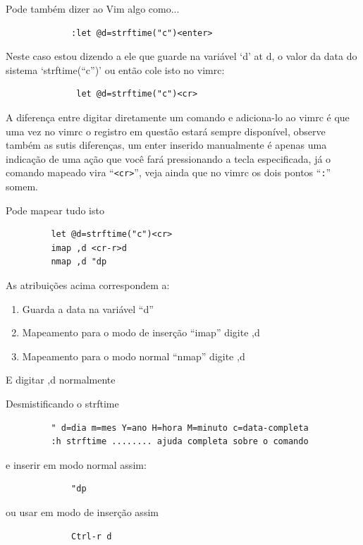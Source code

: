 \documentclass[10pt,a4paper,openany]{book}
\begin{document}
Pode também dizer ao Vim algo como...

\begin{verbatim}
			 :let @d=strftime("c")<enter>
\end{verbatim}

Neste caso estou dizendo a ele que guarde na variável `d' at d,
o valor da data do sistema `strftime(``c'')' ou então cole isto no
vimrc:

\begin{verbatim}
			  let @d=strftime("c")<cr>
\end{verbatim}

A diferença entre digitar diretamente um comando e adiciona-lo ao
vimrc é que uma vez no vimrc o registro em questão estará sempre
disponível, observe também as sutis diferenças, um enter inserido
manualmente é apenas uma indicação de uma ação que você fará
pressionando a tecla especificada, já o comando mapeado vira
``\verb|<cr>|'', veja ainda que no vimrc os dois pontos ``\verb|:|''
somem.

Pode mapear tudo isto

\begin{verbatim}
		 let @d=strftime("c")<cr>
		 imap ,d <cr-r>d
		 nmap ,d "dp
\end{verbatim}

As atribuições acima correspondem a:

\begin{enumerate}
 \item  Guarda a data na variável ``d''
 \item  Mapeamento para o modo de inserção ``imap'' digite ,d
 \item  Mapeamento para o modo normal ``nmap'' digite ,d
\end{enumerate}

E digitar ,d normalmente

Desmistificando o strftime
\begin{verbatim}
		 " d=dia m=mes Y=ano H=hora M=minuto c=data-completa
		 :h strftime ........ ajuda completa sobre o comando
\end{verbatim}

e inserir em modo normal assim:

\begin{verbatim}
			 "dp
\end{verbatim}

ou usar em modo de inserção assim

\begin{verbatim}
			 Ctrl-r d
\end{verbatim}
\end{document}
